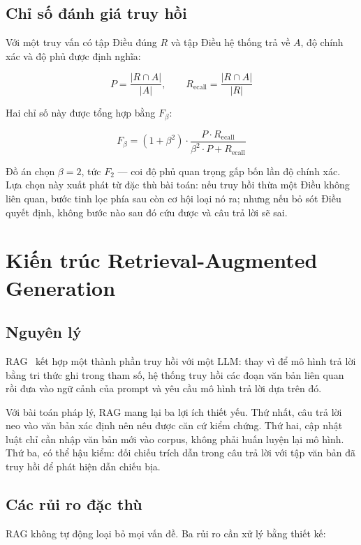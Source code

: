 \documentclass[12pt,a4paper]{report}
\numberwithin{equation}{chapter}
\numberwithin{figure}{chapter}
\numberwithin{table}{chapter}
\begin{document}
\subsection{Chỉ số đánh giá truy hồi}
Với một truy vấn có tập Điều đúng $R$ và tập Điều hệ thống trả về $A$, độ chính
xác và độ phủ được định nghĩa:

\begin{equation}
\label{eq:precision-recall}
P = \frac{|R \cap A|}{|A|}, \qquad
R_{\mathrm{ecall}} = \frac{|R \cap A|}{|R|}
\end{equation}

Hai chỉ số này được tổng hợp bằng $F_\beta$:

\begin{equation}
\label{eq:fbeta}
F_\beta = (1 + \beta^2) \cdot
\frac{P \cdot R_{\mathrm{ecall}}}{\beta^2 \cdot P + R_{\mathrm{ecall}}}
\end{equation}

Đồ án chọn $\beta = 2$, tức $F_2$ --- coi độ phủ quan trọng gấp bốn lần độ chính
xác. Lựa chọn này xuất phát từ đặc thù bài toán: nếu truy hồi thừa một Điều không
liên quan, bước tinh lọc phía sau còn cơ hội loại nó ra; nhưng nếu bỏ sót Điều
quyết định, không bước nào sau đó cứu được và câu trả lời sẽ sai.

\section{Kiến trúc Retrieval-Augmented Generation}

\subsection{Nguyên lý}
RAG~\cite{lewis2020rag} kết hợp một thành phần truy hồi với một LLM: thay vì để
mô hình trả lời bằng tri thức ghi trong tham số, hệ thống truy hồi các đoạn văn
bản liên quan rồi đưa vào ngữ cảnh của prompt và yêu cầu mô hình trả lời dựa trên
đó.

Với bài toán pháp lý, RAG mang lại ba lợi ích thiết yếu. Thứ nhất, câu trả lời
neo vào văn bản xác định nên nêu được căn cứ kiểm chứng. Thứ hai, cập nhật luật
chỉ cần nhập văn bản mới vào corpus, không phải huấn luyện lại mô hình. Thứ ba,
có thể hậu kiểm: đối chiếu trích dẫn trong câu trả lời với tập văn bản đã truy
hồi để phát hiện dẫn chiếu bịa.

\subsection{Các rủi ro đặc thù}
RAG không tự động loại bỏ mọi vấn đề. Ba rủi ro cần xử lý bằng thiết kế:
\end{document}
